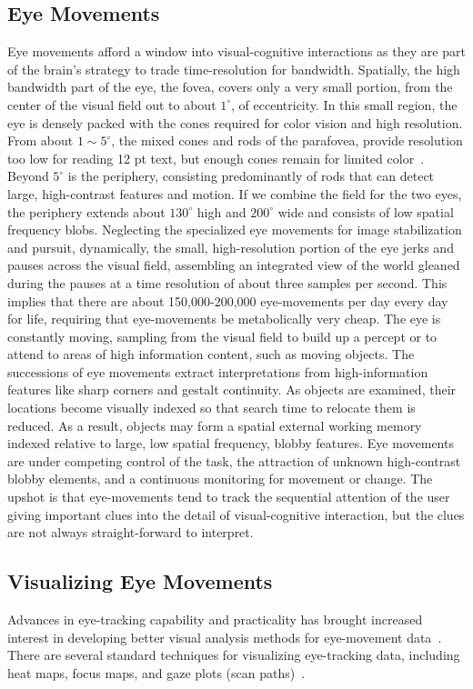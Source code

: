 \documentclass[journal]{vgtc}                %
\DeclareRobustCommand{\deg}{^{\circ}\xspace}
\begin{document}
\subsection{Eye Movements} Eye movements afford a window into
visual-cognitive interactions as they  are part of the brain's 
strategy to trade time-resolution for bandwidth. Spatially, the high bandwidth 
part of the eye, the fovea, covers only a very small portion, from the center 
of the visual field out to about $1\deg$, of eccentricity.
In this small region, the eye is densely packed with the cones required for
color vision and high resolution. From about $1\sim 5\deg$, the mixed cones and rods
of the parafovea, provide resolution too low for reading 12 pt text, but enough cones 
remain for limited color~\cite{Kieras_2014}.  Beyond $5\deg$ is
the periphery, consisting predominantly of rods that can detect large, high-contrast
features and motion. If we combine the field for the two eyes, the
periphery extends about $130\deg$ high and $200\deg$ wide and consists of low spatial
frequency blobs. Neglecting the specialized eye movements for image stabilization and 
pursuit, dynamically, the small, high-resolution portion of the eye jerks and pauses across  
the visual field, assembling an integrated view of the world gleaned during the 
pauses at a time resolution of about three samples per second. This implies that 
there are about 150,000-200,000 eye-movements per day every day for life, requiring 
that eye-movements be metabolically very cheap.  The eye is constantly moving, sampling 
from the visual field to build up a percept or to attend to areas of high
information content, such as moving objects. The successions of eye
movements extract interpretations from high-information features like sharp
corners and gestalt continuity. As objects are examined, their locations
become visually indexed so that search time to relocate them is reduced. As
a result, objects may form a spatial external working memory indexed
relative to large, low spatial frequency, blobby features. Eye movements
are under competing control of the task, the attraction of unknown
high-contrast blobby elements, and a continuous monitoring for movement or
change. The upshot is that eye-movements tend to track the sequential
attention of the user giving important clues into the detail of
visual-cognitive interaction, but the clues are not always straight-forward
to interpret. 


\subsection{Visualizing Eye Movements} Advances in eye-tracking capability
and practicality has brought increased interest in developing better visual
analysis methods for eye-movement data~\cite{Blascheck_2014}. There are
several standard techniques for visualizing eye-tracking data, including
heat maps, focus maps, and gaze plots (scan paths)~\cite{Holmqvist_2011}. 
\end{document}
